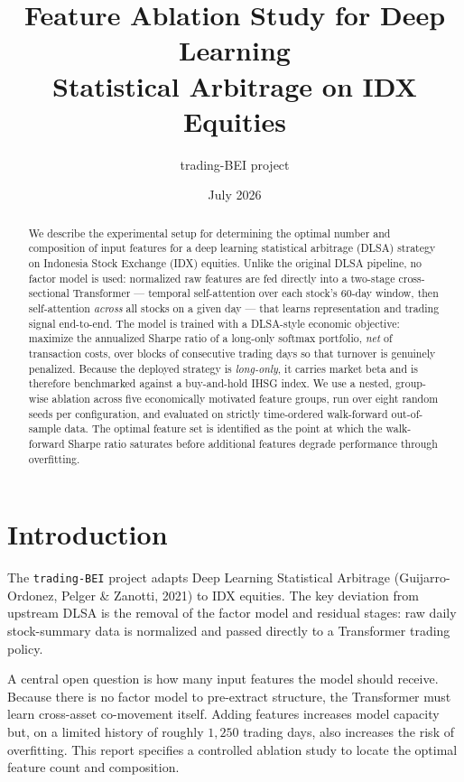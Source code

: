 \documentclass[10pt,twocolumn]{article}
\title{\textbf{Feature Ablation Study for Deep Learning\\
Statistical Arbitrage on IDX Equities}}
\author{trading-BEI project}
\date{July 2026}
\begin{document}
\maketitle

\begin{abstract}
\noindent
We describe the experimental setup for determining the optimal number
and composition of input features for a deep learning statistical
arbitrage (DLSA) strategy on Indonesia Stock Exchange (IDX) equities.
Unlike the original DLSA pipeline, no factor model is used: normalized
raw features are fed directly into a two-stage cross-sectional
Transformer --- temporal self-attention over each stock's 60-day window,
then self-attention \emph{across} all stocks on a given day --- that
learns representation and trading signal end-to-end. The model is trained
with a DLSA-style economic objective: maximize the annualized Sharpe
ratio of a long-only softmax portfolio, \emph{net} of transaction costs,
over blocks of consecutive trading days so that turnover is genuinely
penalized. Because the deployed strategy is \emph{long-only}, it carries
market beta and is therefore benchmarked against a buy-and-hold IHSG
index. We use a nested, group-wise ablation across five economically
motivated feature groups, run over eight random seeds per configuration,
and evaluated on strictly time-ordered walk-forward out-of-sample data.
The optimal feature set is identified as the point at which the
walk-forward Sharpe ratio saturates before additional features degrade
performance through overfitting.
\end{abstract}

\section{Introduction}
The \texttt{trading-BEI} project adapts Deep Learning Statistical
Arbitrage (Guijarro-Ordonez, Pelger \& Zanotti, 2021) to IDX equities.
The key deviation from upstream DLSA is the removal of the factor model
and residual stages: raw daily stock-summary data is normalized and
passed directly to a Transformer trading policy.

A central open question is how many input features the model should
receive. Because there is no factor model to pre-extract structure, the
Transformer must learn cross-asset co-movement itself. Adding features
increases model capacity but, on a limited history of roughly $1{,}250$
trading days, also increases the risk of overfitting. This report
specifies a controlled ablation study to locate the optimal feature
count and composition.
\end{document}
